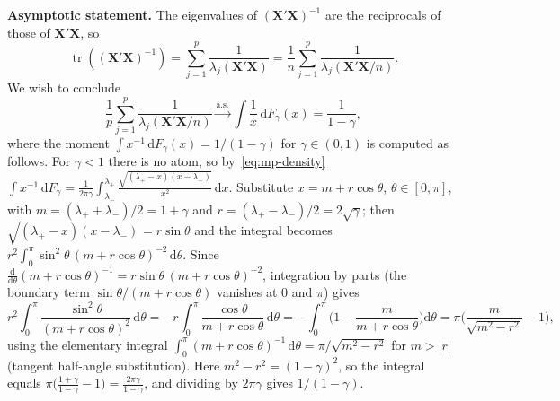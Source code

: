 \documentclass[12pt,a4paper]{article}
\makeatletter
\theoremstyle{definition}
\renewenvironment{proof}[1][\proofname]{\par
  \pushQED{\qed}%
  \normalfont \topsep6\p@\@plus6\p@\relax
  \trivlist
  \item[\hskip\labelsep\bfseries #1\@addpunct{.}]\ignorespaces
}{%
  \popQED\endtrivlist\@endpefalse
}
\DeclareMathOperator\tr{tr}
\newcommand{\bX}{\mathbf{X}}
\newcommand{\dd}{\mathrm{d}}
\makeatother
\begin{document}
\begin{proof}
\textbf{Asymptotic statement.} The eigenvalues of $(\bX'\bX)^{-1}$ are the reciprocals of those of $\bX'\bX$, so
\[
\tr((\bX'\bX)^{-1}) = \sum_{j=1}^p \frac{1}{\lambda_j(\bX'\bX)} = \frac{1}{n}\sum_{j=1}^p \frac{1}{\lambda_j(\bX'\bX/n)}.
\]
We wish to conclude
\begin{equation}\label{eq:mp-trace-limit}
\frac{1}{p}\sum_{j=1}^p\frac{1}{\lambda_j(\bX'\bX/n)} \xrightarrow{\text{a.s.}} \int\frac{1}{x}\,\dd F_\gamma(x) = \frac{1}{1-\gamma},
\end{equation}
where the moment $\int x^{-1}\,\dd F_\gamma(x) = 1/(1-\gamma)$ for $\gamma \in (0,1)$ is computed as follows. For $\gamma < 1$ there is no atom, so by~\eqref{eq:mp-density} $\int x^{-1}\,\dd F_\gamma = \frac{1}{2\pi\gamma}\int_{\lambda_-}^{\lambda_+}\frac{\sqrt{(\lambda_+ - x)(x - \lambda_-)}}{x^2}\,\dd x$. Substitute $x = m + r\cos\theta$, $\theta \in [0,\pi]$, with $m = (\lambda_+ + \lambda_-)/2 = 1 + \gamma$ and $r = (\lambda_+ - \lambda_-)/2 = 2\sqrt\gamma$; then $\sqrt{(\lambda_+ - x)(x - \lambda_-)} = r\sin\theta$ and the integral becomes $r^2\int_0^\pi \sin^2\theta\,(m + r\cos\theta)^{-2}\,\dd\theta$. Since $\frac{\dd}{\dd\theta}(m + r\cos\theta)^{-1} = r\sin\theta\,(m + r\cos\theta)^{-2}$, integration by parts (the boundary term $\sin\theta/(m + r\cos\theta)$ vanishes at $0$ and $\pi$) gives
\[
r^2\!\int_0^\pi \frac{\sin^2\theta}{(m + r\cos\theta)^2}\,\dd\theta = -r\!\int_0^\pi \frac{\cos\theta}{m + r\cos\theta}\,\dd\theta = -\int_0^\pi\!\Big(1 - \frac{m}{m + r\cos\theta}\Big)\dd\theta = \pi\Big(\frac{m}{\sqrt{m^2 - r^2}} - 1\Big),
\]
using the elementary integral $\int_0^\pi (m + r\cos\theta)^{-1}\,\dd\theta = \pi/\sqrt{m^2 - r^2}$ for $m > |r|$ (tangent half-angle substitution). Here $m^2 - r^2 = (1 - \gamma)^2$, so the integral equals $\pi\big(\frac{1+\gamma}{1-\gamma} - 1\big) = \frac{2\pi\gamma}{1-\gamma}$, and dividing by $2\pi\gamma$ gives $1/(1-\gamma)$.


\end{proof}
\end{document}

